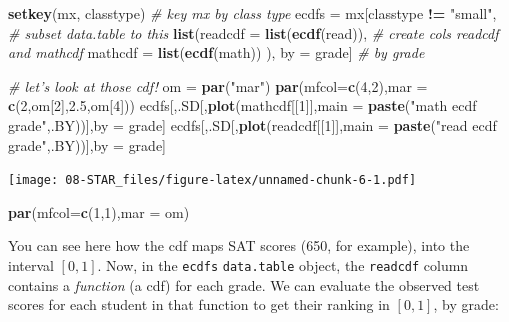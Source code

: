\documentclass[]{book}
\newenvironment{Shaded}{\begin{snugshade}}{\end{snugshade}}
\newcommand{\KeywordTok}[1]{\textcolor[rgb]{0.13,0.29,0.53}{\textbf{#1}}}
\newcommand{\DataTypeTok}[1]{\textcolor[rgb]{0.13,0.29,0.53}{#1}}
\newcommand{\DecValTok}[1]{\textcolor[rgb]{0.00,0.00,0.81}{#1}}
\newcommand{\FloatTok}[1]{\textcolor[rgb]{0.00,0.00,0.81}{#1}}
\newcommand{\StringTok}[1]{\textcolor[rgb]{0.31,0.60,0.02}{#1}}
\newcommand{\CommentTok}[1]{\textcolor[rgb]{0.56,0.35,0.01}{\textit{#1}}}
\newcommand{\OperatorTok}[1]{\textcolor[rgb]{0.81,0.36,0.00}{\textbf{#1}}}
\newcommand{\NormalTok}[1]{#1}
\begin{document}
\begin{Shaded}
\begin{Highlighting}[]
\KeywordTok{setkey}\NormalTok{(mx, classtype)  }\CommentTok{# key mx by class type}
\NormalTok{ecdfs =}\StringTok{ }\NormalTok{mx[classtype }\OperatorTok{!=}\StringTok{ "small"}\NormalTok{,        }\CommentTok{# subset data.table to this}
    \KeywordTok{list}\NormalTok{(}\DataTypeTok{readcdf =} \KeywordTok{list}\NormalTok{(}\KeywordTok{ecdf}\NormalTok{(read)),    }\CommentTok{# create cols readcdf and mathcdf}
         \DataTypeTok{mathcdf =} \KeywordTok{list}\NormalTok{(}\KeywordTok{ecdf}\NormalTok{(math))}
\NormalTok{         ),}
\NormalTok{         by =}\StringTok{ }\NormalTok{grade]    }\CommentTok{# by grade}

\CommentTok{# let's look at those cdf!}
\NormalTok{om =}\StringTok{ }\KeywordTok{par}\NormalTok{(}\StringTok{"mar"}\NormalTok{)}
\KeywordTok{par}\NormalTok{(}\DataTypeTok{mfcol=}\KeywordTok{c}\NormalTok{(}\DecValTok{4}\NormalTok{,}\DecValTok{2}\NormalTok{),}\DataTypeTok{mar =} \KeywordTok{c}\NormalTok{(}\DecValTok{2}\NormalTok{,om[}\DecValTok{2}\NormalTok{],}\FloatTok{2.5}\NormalTok{,om[}\DecValTok{4}\NormalTok{]))}
\NormalTok{ecdfs[,.SD[,}\KeywordTok{plot}\NormalTok{(mathcdf[[}\DecValTok{1}\NormalTok{]],}\DataTypeTok{main =} \KeywordTok{paste}\NormalTok{(}\StringTok{"math ecdf grade"}\NormalTok{,.BY))],by =}\StringTok{ }\NormalTok{grade]}
\NormalTok{ecdfs[,.SD[,}\KeywordTok{plot}\NormalTok{(readcdf[[}\DecValTok{1}\NormalTok{]],}\DataTypeTok{main =} \KeywordTok{paste}\NormalTok{(}\StringTok{"read ecdf grade"}\NormalTok{,.BY))],by =}\StringTok{ }\NormalTok{grade]}
\end{Highlighting}
\end{Shaded}

\texttt{[image: 08-STAR\_files/figure-latex/unnamed-chunk-6-1.pdf]}

\begin{Shaded}
\begin{Highlighting}[]
\KeywordTok{par}\NormalTok{(}\DataTypeTok{mfcol=}\KeywordTok{c}\NormalTok{(}\DecValTok{1}\NormalTok{,}\DecValTok{1}\NormalTok{),}\DataTypeTok{mar =}\NormalTok{ om)}
\end{Highlighting}
\end{Shaded}

You can see here how the cdf maps SAT scores (650, for example), into
the interval \([0,1]\). Now, in the \texttt{ecdfs} \texttt{data.table}
object, the \texttt{readcdf} column contains a \emph{function} (a cdf)
for each grade. We can evaluate the observed test scores for each
student in that function to get their ranking in \([0,1]\), by grade:
\end{document}
